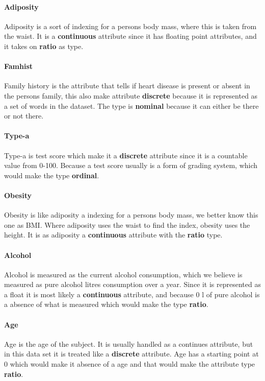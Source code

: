 \paragraph{Adiposity} Adiposity is a sort of indexing for a persons body mass, where this is taken from the waist. It is a \textbf{continuous} attribute since it has floating point attributes, and it takes on \textbf{ratio} as type.

\paragraph{Famhist} Family history is the attribute that tells if heart disease is present or absent in the persons family, this also make attribute \textbf{discrete} because it is represented as a set of words in the dataset. The type is \textbf{nominal} because it can either be there or not there.

\paragraph{Type-a} Type-a is test score which make it a \textbf{discrete} attribute since it is a countable value from 0-100. Because a test score usually is a form of grading system, which would make the type \textbf{ordinal}.

\paragraph{Obesity} Obesity is like adiposity a indexing for a persons body mass, we better know this one as BMI. Where adiposity uses the waist to find the index, obesity uses the height. It is as adiposity a \textbf{continuous} attribute with the \textbf{ratio} type.

\paragraph{Alcohol} Alcohol is measured as the current alcohol consumption, which we believe is measured as pure alcohol litres consumption over a year. Since it is represented as a float it is most likely a \textbf{continuous} attribute, and because 0 l of pure alcohol is a absence of what is measured which would make the type \textbf{ratio}.

\paragraph{Age} Age is the age of the subject. It is usually handled as a continues attribute, but in this data set it is treated like a \textbf{discrete} attribute. Age has a starting point at 0 which would make it absence of a age and that would make the attribute type \textbf{ratio}.

